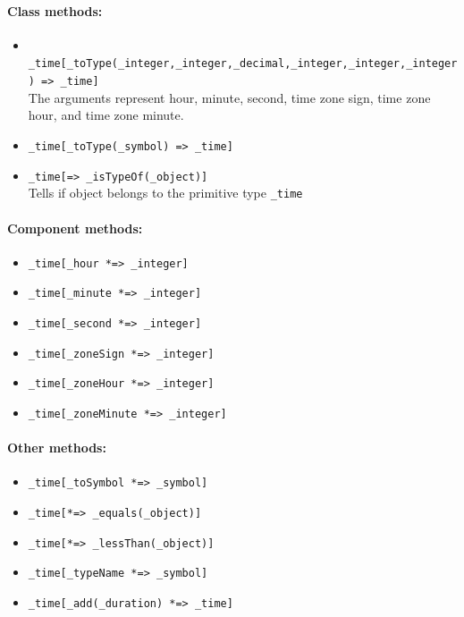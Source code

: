 \documentclass[11pt]{article}
\begin{document}
\paragraph{Class methods:}
\begin{itemize}
\item {\tt
    \_time[\_toType(\_integer,\_integer,\_decimal,\_integer,\_integer,\_integer)
    => \_time]}
  \\
  The arguments represent hour, minute, second, time zone sign, time
  zone hour, and time zone minute.
  \item {\tt \_time[\_toType(\_symbol) => \_time]}
\item {\tt \_time[=> \_isTypeOf(\_object)]}
  \\
  Tells if object belongs to the primitive type {\tt \_time}  
\end{itemize}

\paragraph{Component methods:}
\begin{itemize}
\item {\tt \_time[\_hour *=> \_integer]}
\item {\tt \_time[\_minute *=> \_integer]}
\item {\tt \_time[\_second *=> \_integer]}
\item {\tt \_time[\_zoneSign *=> \_integer]}
\item {\tt \_time[\_zoneHour *=> \_integer]}
\item {\tt \_time[\_zoneMinute *=> \_integer] }
\end{itemize}

\paragraph{Other methods:}
\begin{itemize}
\item {\tt \_time[\_toSymbol *=> \_symbol]}
\item {\tt \_time[*=> \_equals(\_object)]}
\item {\tt \_time[*=> \_lessThan(\_object)]}
\item {\tt \_time[\_typeName *=> \_symbol]}
\item {\tt \_time[\_add(\_duration) *=> \_time] }
\end{itemize}
\end{document}
